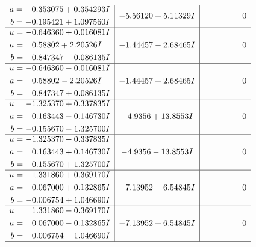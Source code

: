 \documentclass[1p]{elsarticle_modified}
\theoremstyle{definition}
\begin{document}
$$\begin{array}{c|c|c}
\begin{aligned}
a &= -0.353075 + 0.354293 I \\
b &= -0.195421 + 1.097560 I\end{aligned}
 & -5.56120 + 5.11329 I & \phantom{-0.000000 } 0 \\ \hline\begin{aligned}
u &= -0.646360 + 0.016081 I \\
a &= \phantom{-}0.58802 + 2.20526 I \\
b &= \phantom{-}0.847347 - 0.086135 I\end{aligned}
 & -1.44457 - 2.68465 I & \phantom{-0.000000 } 0 \\ \hline\begin{aligned}
u &= -0.646360 - 0.016081 I \\
a &= \phantom{-}0.58802 - 2.20526 I \\
b &= \phantom{-}0.847347 + 0.086135 I\end{aligned}
 & -1.44457 + 2.68465 I & \phantom{-0.000000 } 0 \\ \hline\begin{aligned}
u &= -1.325370 + 0.337835 I \\
a &= \phantom{-}0.163443 - 0.146730 I \\
b &= -0.155670 - 1.325700 I\end{aligned}
 & -4.9356 + 13.8553 I & \phantom{-0.000000 } 0 \\ \hline\begin{aligned}
u &= -1.325370 - 0.337835 I \\
a &= \phantom{-}0.163443 + 0.146730 I \\
b &= -0.155670 + 1.325700 I\end{aligned}
 & -4.9356 - 13.8553 I & \phantom{-0.000000 } 0 \\ \hline\begin{aligned}
u &= \phantom{-}1.331860 + 0.369170 I \\
a &= \phantom{-}0.067000 + 0.132865 I \\
b &= -0.006754 + 1.046690 I\end{aligned}
 & -7.13952 - 6.54845 I & \phantom{-0.000000 } 0 \\ \hline\begin{aligned}
u &= \phantom{-}1.331860 - 0.369170 I \\
a &= \phantom{-}0.067000 - 0.132865 I \\
b &= -0.006754 - 1.046690 I\end{aligned}
 & -7.13952 + 6.54845 I & \phantom{-0.000000 } 0\\
 \hline 

\end{array}$$
\end{document}
